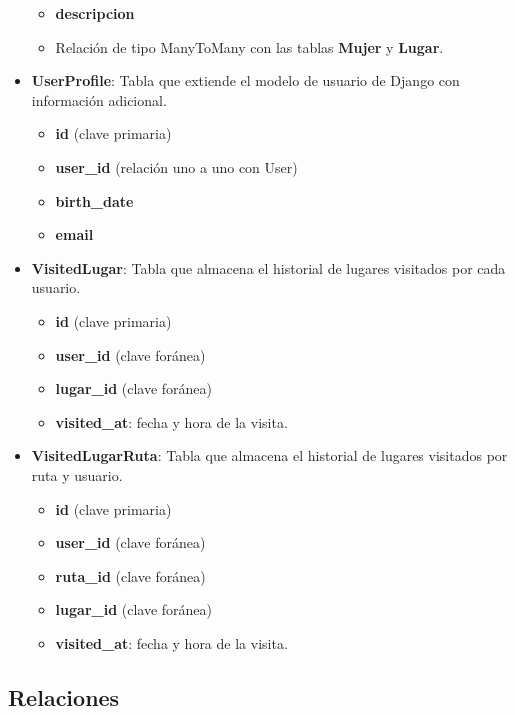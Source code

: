 \begin{itemize}
\begin{itemize}
        \item \textbf{descripcion}
        \item Relación de tipo ManyToMany con las tablas \textbf{Mujer} y \textbf{Lugar}.
    \end{itemize}
    \item \textbf{UserProfile}: Tabla que extiende el modelo de usuario de Django con información adicional.
    \begin{itemize}
        \item \textbf{id} (clave primaria)
        \item \textbf{user\_id} (relación uno a uno con User)
        \item \textbf{birth\_date}
        \item \textbf{email}
    \end{itemize}
    \item \textbf{VisitedLugar}: Tabla que almacena el historial de lugares visitados por cada usuario.
    \begin{itemize}
        \item \textbf{id} (clave primaria)
        \item \textbf{user\_id} (clave foránea)
        \item \textbf{lugar\_id} (clave foránea)
        \item \textbf{visited\_at}: fecha y hora de la visita.
    \end{itemize}
    \item \textbf{VisitedLugarRuta}: Tabla que almacena el historial de lugares visitados por ruta y usuario.
    \begin{itemize}
        \item \textbf{id} (clave primaria)
        \item \textbf{user\_id} (clave foránea)
        \item \textbf{ruta\_id} (clave foránea)
        \item \textbf{lugar\_id} (clave foránea)
        \item \textbf{visited\_at}: fecha y hora de la visita.
    \end{itemize}
\end{itemize}

\subsection{Relaciones}

